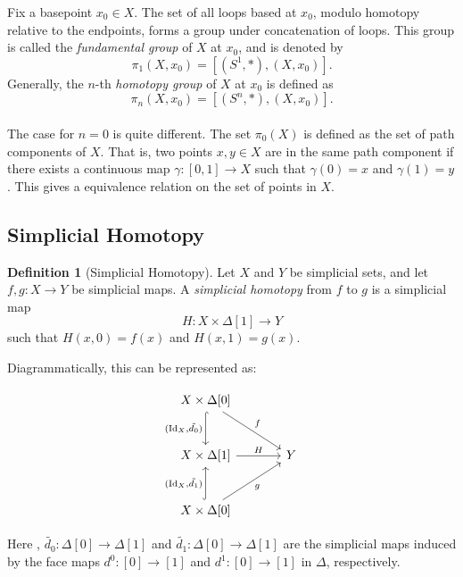 \documentclass[11pt]{article}
\theoremstyle{definition}
\newtheorem{definition}{Definition}[section]
\theoremstyle{plain}
\begin{document}
Fix a basepoint $x_0 \in X$. The set of all loops based at $x_0$, modulo homotopy relative to the endpoints, forms a group under concatenation of loops.
This group is called the \emph{fundamental group} of $X$ at $x_0$, and is denoted by
\[
    \pi_1(X, x_0) =[(S^1, \ast  ),(X, x_0)].
\]
Generally, the $n$-th \emph{homotopy group} of $X$ at $x_0$ is defined as
\[
    \pi_n(X, x_0) =[(S^n, \ast  ),(X, x_0)].
\]

\paragraph{}
The case for $n=0$ is quite different. The set $\pi_0(X)$ is defined as the set of path components of $X$. That is, two points $x,y \in X$ are in the same path component if there exists a continuous map $\gamma : [0,1] \to X$ such that $\gamma(0) = x$ and $\gamma(1) = y$. This gives a equivalence relation on the set of points in $X$.


\subsection{Simplicial Homotopy}

\begin{definition}[Simplicial Homotopy]
    Let $X$ and $Y$ be simplicial sets, and let $f, g : X \to Y$ be simplicial maps. A \emph{simplicial homotopy} from $f$ to $g$ is a simplicial map
    \[
        H : X \times \Delta[1] \to Y
    \]
    such that $H(x, 0) = f(x)$ and $H(x, 1) = g(x)$.
\end{definition}

Diagrammatically, this can be represented as:


\[
    \begin{tikzcd}[row sep=large, column sep=large]
        X \times \Delta[0] \arrow[d,hook,"{(\mathrm{Id}_X,\tilde{d_0})}"'] \arrow[dr,"f"] & \\
        X \times \Delta[1] \arrow[r,"H"] & Y \\
        X \times \Delta[0] \arrow[u,hook,"{(\mathrm{Id}_X,\tilde{d_1})}"] \arrow[ur,"g"'] &
    \end{tikzcd}
\]

Here , $\tilde{d_0} : \Delta[0] \to \Delta[1]$ and $\tilde{d_1} : \Delta[0] \to \Delta[1]$ are the simplicial maps induced by the face maps $d^0 : [0] \to [1]$ and $d^1 : [0] \to [1]$ in $\Delta$, respectively.
\end{document}

